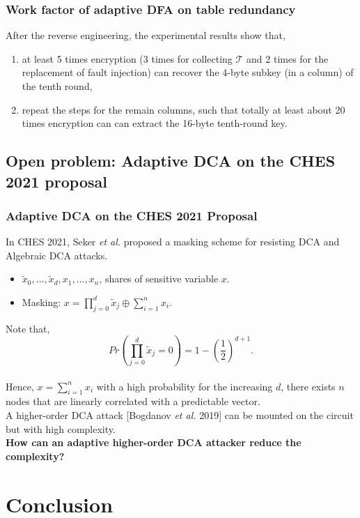 \documentclass{beamer}
\begin{document}
\frame
{
	\frametitle{Work factor of adaptive DFA on table redundancy}
	After the reverse engineering, the experimental results show that,
	\begin{enumerate}[1.]
		\item at least 5 times encryption (3 times for collecting $\mathcal{T}$ and 2 times for the replacement of fault injection) can recover the 4-byte subkey (in a column) of the tenth round,
		\item repeat the steps for the remain columns, such that totally at least about 20 times encryption can can extract the 16-byte tenth-round key.
	\end{enumerate}
}


\subsection{Open problem: Adaptive DCA on the CHES 2021 proposal}
\frame
{
	\frametitle{Adaptive DCA on the CHES 2021 Proposal}
	In CHES 2021, Seker \textit{et al.} proposed a masking scheme for resisting DCA and Algebraic DCA attacks.
	\\[2ex]
	\begin{itemize}
		\item $\tilde{x}_0,...,\tilde{x}_d,x_1,...,x_n$, shares of sensitive variable $x$.
		\item Masking: $x=\prod_{j=0}^{d}\tilde{x}_j\oplus \sum_{i=1}^{n}x_i$.
	\end{itemize}
}
\frame
{
	Note that,
	\[Pr(\prod_{j=0}^{d}\tilde{x}_j=0)=1-(\frac{1}{2})^{d+1}.\]
	\\[2ex]
	Hence, $x=\sum_{i=1}^{n}x_i$ with a high probability for the increasing $d$, there exists $n$ nodes that are linearly correlated with a predictable vector.
	\\[2ex]
	A higher-order DCA attack [Bogdanov \textit{et al.} 2019] can be mounted on the circuit but with high complexity.
	\\[2ex]
	\textbf{How can an adaptive higher-order DCA attacker reduce the complexity?}
}

\section{Conclusion}

\end{document}
